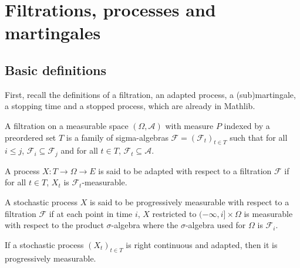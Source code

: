 \chapter{{Filtrations, processes and martingales}}\label{chap:filtration_martingale}


\section{Basic definitions}

First, recall the definitions of a filtration, an adapted process, a (sub)martingale, a stopping time and a stopped process, which are already in Mathlib.


\begin{definition}[Filtration]\label{def:filtration}
  \mathlibok
A filtration on a measurable space $(\Omega, \mathcal{A})$ with measure $P$ indexed by a preordered set $T$ is a family of sigma-algebras $\mathcal{F} = (\mathcal{F}_t)_{t \in T}$ such that for all $i \le j$, $\mathcal{F}_i \subseteq \mathcal{F}_j$ and for all $t \in T$, $\mathcal{F}_t \subseteq \mathcal{A}$.
\end{definition}


\begin{definition}\label{def:adapted}
  \mathlibok
A process $X : T \to \Omega \to E$ is said to be adapted with respect to a filtration $\mathcal{F}$ if for all $t \in T$, $X_t$ is $\mathcal{F}_t$-measurable.
\end{definition}


\begin{definition}\label{def:ProgMeasurable}
  \mathlibok
A stochastic process $X$ is said to be progressively measurable with respect to a filtration $\mathcal{F}$ if at each point in time $i$, $X$ restricted to $(-\infty, i] \times \Omega$ is measurable with respect to the product $\sigma$-algebra where the $\sigma$-algebra used for $\Omega$ is $\mathcal{F}_i$.
\end{definition}


\begin{lemma}\label{lem:Adapted.progMeasurable_of_rightContinuous}
  \leanok
If a stochastic process $(X_t)_{t \in T}$ is right continuous and adapted, then it is progressively measurable.
\end{lemma}

